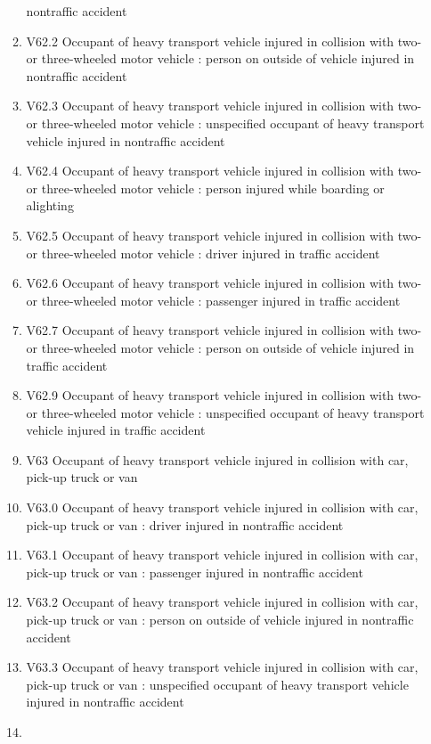 \documentclass[
]{scrartcl}
\begin{document}
\begin{itemize}
\begin{enumerate}
    nontraffic accident
  \item
    V62.2 Occupant of heavy transport vehicle injured in collision with
    two- or three-wheeled motor vehicle : person on outside of vehicle
    injured in nontraffic accident
  \item
    V62.3 Occupant of heavy transport vehicle injured in collision with
    two- or three-wheeled motor vehicle : unspecified occupant of heavy
    transport vehicle injured in nontraffic accident
  \item
    V62.4 Occupant of heavy transport vehicle injured in collision with
    two- or three-wheeled motor vehicle : person injured while boarding
    or alighting
  \item
    V62.5 Occupant of heavy transport vehicle injured in collision with
    two- or three-wheeled motor vehicle : driver injured in traffic
    accident
  \item
    V62.6 Occupant of heavy transport vehicle injured in collision with
    two- or three-wheeled motor vehicle : passenger injured in traffic
    accident
  \item
    V62.7 Occupant of heavy transport vehicle injured in collision with
    two- or three-wheeled motor vehicle : person on outside of vehicle
    injured in traffic accident
  \item
    V62.9 Occupant of heavy transport vehicle injured in collision with
    two- or three-wheeled motor vehicle : unspecified occupant of heavy
    transport vehicle injured in traffic accident
  \item
    V63 Occupant of heavy transport vehicle injured in collision with
    car, pick-up truck or van
  \item
    V63.0 Occupant of heavy transport vehicle injured in collision with
    car, pick-up truck or van : driver injured in nontraffic accident
  \item
    V63.1 Occupant of heavy transport vehicle injured in collision with
    car, pick-up truck or van : passenger injured in nontraffic accident
  \item
    V63.2 Occupant of heavy transport vehicle injured in collision with
    car, pick-up truck or van : person on outside of vehicle injured in
    nontraffic accident
  \item
    V63.3 Occupant of heavy transport vehicle injured in collision with
    car, pick-up truck or van : unspecified occupant of heavy transport
    vehicle injured in nontraffic accident
  \item

\end{enumerate}
\end{itemize}
\end{document}
